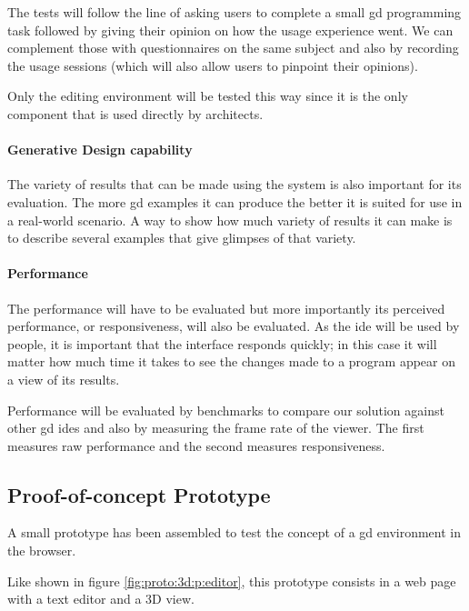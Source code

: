 \documentclass{./llncs2e/llncs}
\begin{document}
	The tests will follow the line of asking users to complete a small \ac{gd} programming task followed by giving their opinion on how the usage experience went.
	We can complement those with questionnaires on the same subject and also by recording the usage sessions (which will also allow users to pinpoint their opinions).
	
	Only the editing environment will be tested this way since it is the only component that is used directly by architects.
	
	\paragraph{Generative Design capability}
	The variety of results that can be made using the system is also important for its evaluation.
	The more \ac{gd} examples it can produce the better it is suited for use in a real-world scenario.
	A way to show how much variety of results it can make is to describe several examples that give glimpses of that variety.
	
	\paragraph{Performance}
	The performance will have to be evaluated but more importantly its perceived performance, or responsiveness, will also be evaluated.
	As the \ac{ide} will be used by people, it is important that the interface responds quickly;
	in this case it will matter how much time it takes to see the changes made to a program appear on a view of its results.
	
	Performance will be evaluated by benchmarks to compare our solution against other \ac{gd} \ac{ide}s and also by measuring the frame rate of the viewer.
	The first measures raw performance and the second measures responsiveness.

\subsection{Proof-of-concept Prototype}
	A small prototype has been assembled to test the concept of a \ac{gd} environment in the browser.

	Like shown in figure \ref{fig:proto:3d:p:editor}, this prototype consists in a web page with a text editor and a 3D view.
\end{document}
